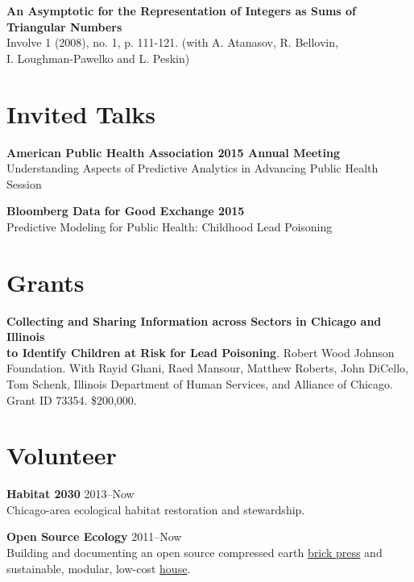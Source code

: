 \documentclass[margin,line]{resume}
\begin{document}
\begin{resume}
        \newpage
	{\bf An Asymptotic for the Representation of Integers as Sums of\\Triangular Numbers} \\
	Involve 1 (2008), no. 1, p. 111-121. (with A. Atanasov, R. Bellovin,\\ I. Loughman-Pawelko and L. Peskin)

	\section{\mysidestyle Invited Talks}
	{\bf American Public Health Association 2015 Annual Meeting} \\
    Understanding Aspects of Predictive Analytics in Advancing Public Health Session

	{\bf Bloomberg Data for Good Exchange 2015} \\
    Predictive Modeling for Public Health: Childhood Lead Poisoning

	\section{\mysidestyle Grants}
        {\bf Collecting and Sharing Information across Sectors in Chicago and Illinois\\ to Identify Children at Risk for Lead Poisoning}. Robert Wood Johnson\\ Foundation. With Rayid Ghani, Raed Mansour, Matthew Roberts, John DiCello,\\ Tom Schenk,  Illinois Department of Human Services, and Alliance of Chicago.\\ Grant ID 73354. \$200,000. \\

	\section{\mysidestyle Volunteer} 
	{\bf Habitat 2030} \hfill {2013--Now} \\
	Chicago-area ecological habitat restoration and stewardship.

	{\bf Open Source Ecology} \hfill {2011--Now} \\
	Building and documenting an open source compressed earth \href{http://opensourceecology.org/portfolio/ceb-press/}{brick press} and \\ sustainable, modular, low-cost \href{http://opensourceecology.org/portfolio/microhouse/}{house}.


\end{resume}
\end{document}
